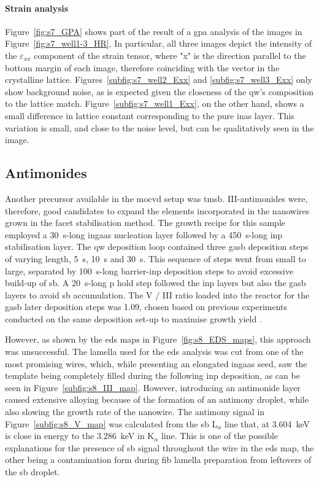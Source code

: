 \paragraph{Strain analysis} Figure~\ref{fig:s7_GPA} shows part of the result of a \acf{gpa} analysis of the images in Figure~\ref{fig:s7_well1-3_HR}. In particular, all three images depict the intensity of the $\varepsilon_{xx}$ component of the strain tensor, where "x" is the direction parallel to the bottom margin of each image, therefore coinciding with the  vector in the crystalline lattice. Figures~\ref{subfig:s7_well2_Exx} and \ref{subfig:s7_well3_Exx} only show background noise, as is expected given the closeness of the \acs{qw}'s composition to the lattice match. Figure~\ref{subfig:s7_well1_Exx}, on the other hand, shows a small difference in lattice constant corresponding to the pure \acs{inas} layer. This variation is small, and close to the noise level, but can be qualitatively seen in the image.

\subsection{Antimonides}

Another precursor available in the \acs{mocvd} setup was \acf{tmsb}. III-antimonides were, therefore, good candidates to expand the elements incorporated in the nanowires grown in the  facet stabilisation method. The growth recipe for this sample employed a \qty{30}{\second}-long \acs{ingaas} nucleation layer followed by a \qty{450}{\second}-long \acs{inp} stabilisation layer. The \acl{qw} deposition loop contained three \acf{gasb} deposition steps of varying length, \qty{5}{\second}, \qty{10}{\second} and \qty{30}{\second}. This sequence of steps went from small to large, separated by \qty{100}{\second}-long barrier-\acs{inp} deposition steps to avoid excessive build-up of \acl{sb}. A \qty{20}{\second}-long \acl{p} hold step followed the \acs{inp} layers but also the \acs{gasb} layers to avoid \acl{sb} accumulation. The V / III ratio loaded into the reactor for the \acs{gasb} later deposition steps was \num{1.09}, chosen based on previous experiments conducted on the same deposition set-up to maximise growth yield \cite{Borg2017}.

However, as shown by the \acs{eds} maps in Figure~\ref{fig:s8_EDS_maps}, this approach was unsuccessful. The lamella used for the \acs{eds} analysis was cut from one of the most promising wires, which, while presenting an elongated \acs{ingaas} seed, saw the template being completely filled during the following \acs{inp} deposition, as can be seen in Figure~\ref{subfig:s8_III_map}. However, introducing an antimonide layer caused extensive alloying because of the formation of an antimony droplet, while also slowing the growth rate of the nanowire. The antimony signal in Figure~\ref{subfig:s8_V_map} was calculated from the \acl{sb} L\(_\alpha\) line that, at \qty{3.604}{\kilo\eV} is close in energy to the \qty{3.286}{\kilo\eV} \acl{in} K\(_\alpha\) line. This is one of the possible explanations for the presence of \acl{sb} signal throughout the wire in the \acs{eds} map, the other being a contamination form during \acs{fib} lamella preparation from leftovers of the \acl{sb} droplet.

